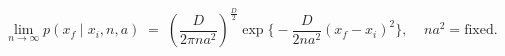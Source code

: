 \begin{equation}
\lim _{n \to \infty }  p(x_f \mid x_i,n,a) \; = \; 
\left(\frac{D}{2 \pi n a^2}\right)^{\frac{D}{2}} 
\exp \biggl\{-\frac{D}{2
na^2}\left(x_f-x_i\right)^2  \biggr\}, \; \; \; \; 
na^2 = \mathrm{fixed}  . 
\label{clt} 
\end{equation}


